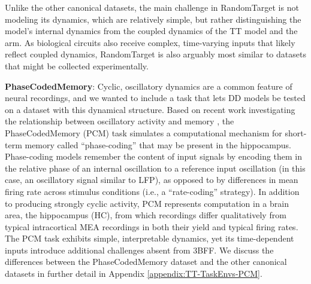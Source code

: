 \documentclass{article}
\begin{document}
Unlike the other canonical datasets, the main challenge in RandomTarget is not modeling its dynamics, which are relatively simple, but rather distinguishing the model’s internal dynamics from the coupled dynamics of the TT model and the arm. As biological circuits also receive complex, time-varying inputs that likely reflect coupled dynamics, RandomTarget is also arguably most similar to datasets that might be collected experimentally.

\textbf{PhaseCodedMemory}: Cyclic, oscillatory dynamics are a common feature of neural recordings, and we wanted to include a task that lets DD models be tested on a dataset with this dynamical structure. Based on recent work investigating the relationship between oscillatory activity and memory \cite{Pals2024-co}, the PhaseCodedMemory (PCM) task simulates a computational mechanism for short-term memory called “phase-coding” that may be present in the hippocampus. Phase-coding models remember the content of input signals by encoding them in the relative phase of an internal oscillation to a reference input oscillation (in this case, an oscillatory signal similar to LFP), as opposed to by differences in mean firing rate across stimulus conditions (i.e., a “rate-coding” strategy). In addition to producing strongly cyclic activity, PCM represents computation in a brain area, the hippocampus (HC), from which recordings differ qualitatively from typical intracortical MEA recordings in both their yield and typical firing rates. The PCM task exhibits simple, interpretable dynamics, yet its time-dependent inputs introduce additional challenges absent from 3BFF. We discuss the differences between the PhaseCodedMemory dataset and the other canonical datasets in further detail in Appendix \ref{appendix:TT-TaskEnvs-PCM}.
\end{document}
